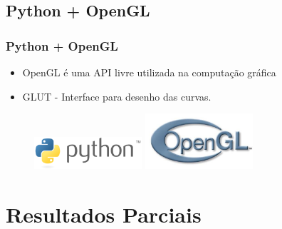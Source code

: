 \documentclass{beamer}
\begin{document}

\subsection{Python + OpenGL}
\begin{frame}
\frametitle{Python + OpenGL}
\begin{itemize}
	\item OpenGL é uma API livre utilizada na computação gráfica
	\item GLUT - Interface para desenho das curvas. 
\end{itemize}

\begin{figure}[h]	
\centering
\includegraphics[width=4cm]{Python}
\qquad
\includegraphics[width=4cm]{logoopengl}
\end{figure}

\end{frame}    

\section{Resultados Parciais}
\begin{frame}
\tableofcontents[ 
    currentsubsection, 
    hideothersubsections, 
    sectionstyle=show/shaded
    ] 
\end{frame}
\end{document}
